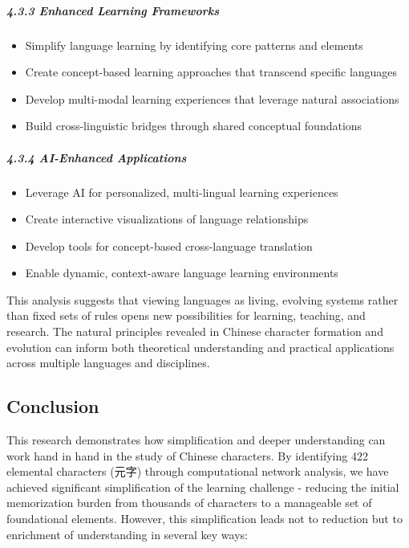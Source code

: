 \hypertarget{enhanced-learning-frameworks}{%
\subparagraph{4.3.3 Enhanced Learning
Frameworks}\label{enhanced-learning-frameworks}}

\begin{itemize}
\tightlist
\item
  Simplify language learning by identifying core patterns and elements
\item
  Create concept-based learning approaches that transcend specific
  languages
\item
  Develop multi-modal learning experiences that leverage natural
  associations
\item
  Build cross-linguistic bridges through shared conceptual foundations
\end{itemize}

\hypertarget{ai-enhanced-applications}{%
\subparagraph{4.3.4 AI-Enhanced
Applications}\label{ai-enhanced-applications}}

\begin{itemize}
\tightlist
\item
  Leverage AI for personalized, multi-lingual learning experiences
\item
  Create interactive visualizations of language relationships
\item
  Develop tools for concept-based cross-language translation
\item
  Enable dynamic, context-aware language learning environments
\end{itemize}

This analysis suggests that viewing languages as living, evolving
systems rather than fixed sets of rules opens new possibilities for
learning, teaching, and research. The natural principles revealed in
Chinese character formation and evolution can inform both theoretical
understanding and practical applications across multiple languages and
disciplines.

\hypertarget{conclusion}{%
\subsection{Conclusion}\label{conclusion}}

This research demonstrates how simplification and deeper understanding
can work hand in hand in the study of Chinese characters. By identifying
422 elemental characters (元字) through computational network analysis,
we have achieved significant simplification of the learning challenge -
reducing the initial memorization burden from thousands of characters to
a manageable set of foundational elements. However, this simplification
leads not to reduction but to enrichment of understanding in several key
ways:

